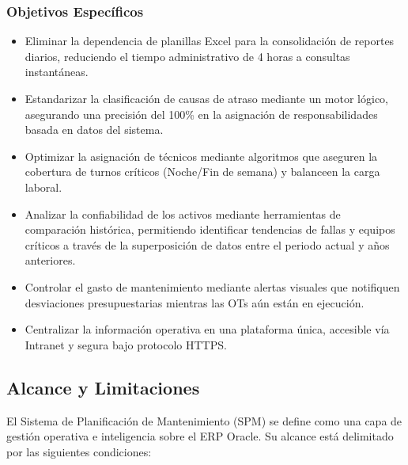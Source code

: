 \documentclass[11pt, letterpaper]{article}
\begin{document}
\subsubsection{Objetivos Específicos}
\begin{itemize}
    \item Eliminar la dependencia de planillas Excel para la consolidación de reportes diarios, reduciendo el tiempo administrativo de 4 horas a consultas instantáneas.
    \item Estandarizar la clasificación de causas de atraso mediante un motor lógico, asegurando una precisión del 100\% en la asignación de responsabilidades basada en datos del sistema.
    \item Optimizar la asignación de técnicos mediante algoritmos que aseguren la cobertura de turnos críticos (Noche/Fin de semana) y balanceen la carga laboral.
    \item Analizar la confiabilidad de los activos mediante herramientas de comparación histórica, permitiendo identificar tendencias de fallas y equipos críticos a través de la superposición de datos entre el periodo actual y años anteriores.
    \item Controlar el gasto de mantenimiento mediante alertas visuales que notifiquen desviaciones presupuestarias mientras las OTs aún están en ejecución.
    \item Centralizar la información operativa en una plataforma única, accesible vía Intranet y segura bajo protocolo HTTPS.
\end{itemize}

\subsection{Alcance y Limitaciones}

El Sistema de Planificación de Mantenimiento (SPM) se define como una capa de gestión operativa e inteligencia sobre el ERP Oracle. Su alcance está delimitado por las siguientes condiciones:
\end{document}
